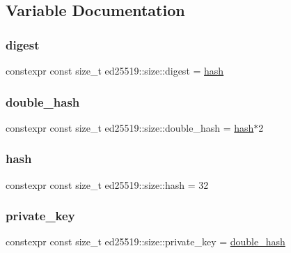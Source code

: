 \subsection{Variable Documentation}
\mbox{\label{namespaceed25519_1_1size_ab3443d829236034a3824204b295de4d0}} 
\subsubsection{\texorpdfstring{digest}{digest}}
{\footnotesize\ttfamily constexpr const size\+\_\+t ed25519\+::size\+::digest = \mbox{\hyperlink{namespaceed25519_1_1size_a0c20525cc9711076ec093177a8e36c25}{hash}}}

\mbox{\label{namespaceed25519_1_1size_ac853f864bb12792f88647a998c3c030f}} 
\subsubsection{\texorpdfstring{double\+\_\+hash}{double\_hash}}
{\footnotesize\ttfamily constexpr const size\+\_\+t ed25519\+::size\+::double\+\_\+hash = \mbox{\hyperlink{namespaceed25519_1_1size_a0c20525cc9711076ec093177a8e36c25}{hash}}$\ast$2}

\mbox{\label{namespaceed25519_1_1size_a0c20525cc9711076ec093177a8e36c25}} 
\subsubsection{\texorpdfstring{hash}{hash}}
{\footnotesize\ttfamily constexpr const size\+\_\+t ed25519\+::size\+::hash = 32}

\mbox{\label{namespaceed25519_1_1size_a2e21f8a4af0331d49145f1893a441eed}} 
\subsubsection{\texorpdfstring{private\+\_\+key}{private\_key}}
{\footnotesize\ttfamily constexpr const size\+\_\+t ed25519\+::size\+::private\+\_\+key = \mbox{\hyperlink{namespaceed25519_1_1size_ac853f864bb12792f88647a998c3c030f}{double\+\_\+hash}}}

